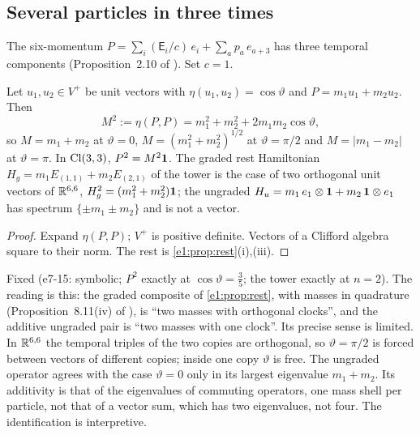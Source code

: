 \subsection{Several particles in three times}
\label{e7:sec:sixmomenta}

The six-momentum $P=\sum_i(\mathsf E_i/c)\,e_i+\sum_ap_a\,e_{a+3}$ has three temporal components (Proposition~2.10 of \cite{RE}). Set $c=1$.

\begin{proposition}
\label{e7:prop:sixmass}
Let $u_1,u_2\in V^+$ be unit vectors with $\eta(u_1,u_2)=\cos\vartheta$ and $P=m_1u_1+m_2u_2$. Then
\[
M^2:=\eta(P,P)=m_1^2+m_2^2+2m_1m_2\cos\vartheta ,
\]
so $M=m_1+m_2$ at $\vartheta=0$, $M=(m_1^2+m_2^2)^{1/2}$ at $\vartheta=\pi/2$ and $M=|m_1-m_2|$ at $\vartheta=\pi$. In $\mathrm{Cl}(3,3)$, $P^2=M^2\mathbf 1$.
The graded rest Hamiltonian $H_g=m_1E_{(1,1)}+m_2E_{(2,1)}$ of the tower is the case of two orthogonal unit vectors of $\mathbb{R}^{6,6}$, $H_g^2=(m_1^2+m_2^2)\mathbf 1$;
the ungraded $H_u=m_1\,e_1\otimes\mathbf 1+m_2\,\mathbf 1\otimes e_1$ has spectrum $\{\pm m_1\pm m_2\}$ and is not a vector.
\end{proposition}

\begin{proof}
Expand $\eta(P,P)$; $V^+$ is positive definite. Vectors of a Clifford algebra square to their norm. The rest is \cref{e1:prop:rest}(i),(iii).
\end{proof}

Fixed (e7-15: symbolic; $P^2$ exactly at $\cos\vartheta=\tfrac35$; the tower exactly at $n=2$). The reading is this: the graded composite of
\cref{e1:prop:rest}, with masses in quadrature (Proposition~8.11(iv) of \cite{RE}), is ``two masses with orthogonal clocks'', and the additive
ungraded pair is ``two masses with one clock''. Its precise sense is limited. In $\mathbb{R}^{6,6}$ the temporal triples of the two copies are orthogonal,
so $\vartheta=\pi/2$ is forced between vectors of different copies; inside one copy $\vartheta$ is free. The ungraded operator agrees with the
case $\vartheta=0$ only in its largest eigenvalue $m_1+m_2$. Its additivity is that of the eigenvalues of commuting operators, one mass shell per
particle, not that of a vector sum, which has two eigenvalues, not four. The identification is interpretive.

